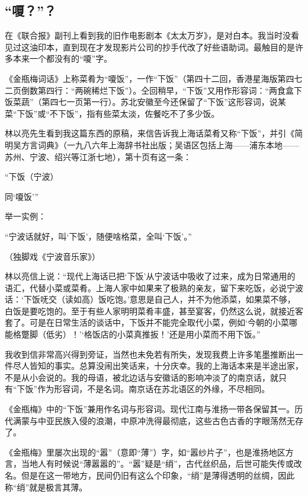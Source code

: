 \subsection{“嗄？”？}



\par 在《联合报》副刊上看到我的旧作电影剧本《太太万岁》，是对白本。我当时没看见过这油印本，直到现在才发现影片公司的抄手代改了好些语助词。最触目的是许多本来一个都没有的“嗄”字。
\par 《金瓶梅词话》上称菜肴为“嗄饭”，一作“下饭”（第四十二回，香港星海版第四七二页倒数第四行：“两碗稀烂下饭”）。仝回稍早，“下饭”又用作形容词：“两食盒下饭菜蔬”（第四七一页第一行）。苏北安徽至今还保留了“下饭”这形容词，说某菜“下饭”或“不下饭”，指有些菜太淡，佐餐吃不了多少饭。
\par 林以亮先生看到我这篇东西的原稿，来信告诉我上海话菜肴又称“下饭”，并引《简明吴方言词典》（一九八六年上海辞书社出版；吴语区包括上海——浦东本地——苏州、宁波、绍兴等江浙七地），第十页有这一条：
\par “下饭（宁波）
\par 同‘嗄饭’”
\par 举一实例：
\par “宁波话就好，叫‘下饭’，随便啥格菜，全叫‘下饭’。”
\par （独脚戏《宁波音乐家》）
\par 林以亮信上说：“现代上海话已把‘下饭’从宁波话中吸收了过来，成为日常通用的语汇，代替小菜或菜肴。上海人家中如果来了极熟的亲友，留下来吃饭，必说宁波话：‘下饭呒交（读如高）饭吃饱。’意思是自己人，并不为他添菜，如果菜不够，白饭是要吃饱的。至于有些人家明明菜肴丰盛，甚至宴客，仍然这么说，就接近客套了。可是在日常生活的谈话中，下饭并不能完全取代小菜，例如‘今朝的小菜哪能格蹩脚（低劣）！'‘格饭店的小菜真推扳！’还是用小菜而不用下饭。”
\par 我收到信非常高兴得到旁证，当然也未免若有所失，发现我费上许多笔墨推断出一件尽人皆知的事实。总算没闹出笑话来，十分庆幸。我的上海话本来是半途出家，不是从小会说的。我的母语，被北边话与安徽话的影响冲淡了的南京话，就只有“下饭”作为形容词，不是名词。南京话在苏北语区的外缘，不尽相同。
\par 《金瓶梅》中的“下饭”兼用作名词与形容词。现代江南与淮扬一带各保留其一。历代满蒙与中亚民族入侵的浪潮，中原冲洗得最彻底，这些古色古香的字眼荡然无存了。
\par 《金瓶梅》里屡次出现的“嚣”（意即“薄”）字，如“嚣纱片子”，也是淮扬地区方言，当地人有时候说“薄嚣嚣的”。“嚣”疑是“绡”，古代丝织品，后世可能失传或改名。但是在这一带地方，民间仍旧有这么个印象，“绡”是薄得透明的丝绸，因此称“绡”就是极言其薄。
